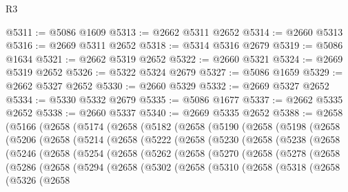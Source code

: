 \begin{lexlean}{R3}
\begin{coremodule}
@5311 := @5086 @1609
@5313 := @2662 @5311 @2652
@5314 := @2660 @5313
@5316 := @2669 @5311 @2652
@5318 := @5314 @5316 @2679
@5319 := @5086 @1634
@5321 := @2662 @5319 @2652
@5322 := @2660 @5321
@5324 := @2669 @5319 @2652
@5326 := @5322 @5324 @2679
@5327 := @5086 @1659
@5329 := @2662 @5327 @2652
@5330 := @2660 @5329
@5332 := @2669 @5327 @2652
@5334 := @5330 @5332 @2679
@5335 := @5086 @1677
@5337 := @2662 @5335 @2652
@5338 := @2660 @5337
@5340 := @2669 @5335 @2652
@5388 := @2658
    (@5166
      (@2658
        (@5174
          (@2658
            (@5182
              (@2658
                (@5190
                  (@2658
                    (@5198
                      (@2658
                        (@5206
                          (@2658
                            (@5214
                              (@2658
                                (@5222
                                  (@2658
                                    (@5230
                                      (@2658
                                        (@5238
                                          (@2658
                                            (@5246
                                              (@2658
                                                (@5254
                                                  (@2658
                                                    (@5262
                                                      (@2658
                                                        (@5270
                                                          (@2658
                                                            (@5278
                                                              (@2658
                                                                (@5286
                                                                  (@2658
                                                                    (@5294
                                                                      (@2658
                                                                        (@5302
                                                                          (@2658
                                                                            (@5310
                                                                              (@2658
                                                                                (@5318
                                                                                  (@2658
                                                                                    (@5326
                                                                                      (@2658

\end{coremodule}
\end{lexlean}

